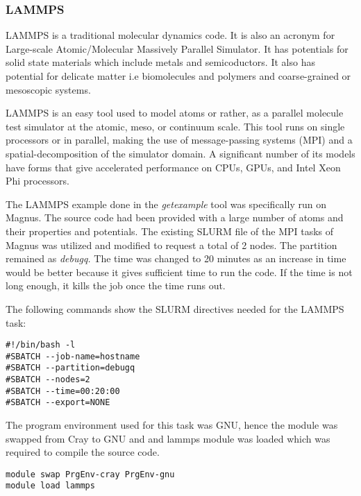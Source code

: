 \subsubsection{LAMMPS}

LAMMPS is a traditional molecular dynamics code. It is also an acronym for Large-scale Atomic/Molecular Massively Parallel Simulator. It has potentials
for solid state materials which include metals and semicoductors. It also has potential for delicate matter i.e biomolecules and polymers and
coarse-grained or mesoscopic systems.

LAMMPS is an easy tool used to model atoms or rather, as a parallel molecule test simulator at the atomic, meso, or continuum scale. This tool runs on
single processors or in parallel, making the use of message-passing systems (MPI) and a spatial-decomposition of the simulator domain. A significant
number of its models have forms that give accelerated performance on CPUs, GPUs, and Intel Xeon Phi processors.

The LAMMPS example done in the \emph{getexample} tool was specifically run on Magnus. The source code had been provided with a large number of atoms and their
properties and potentials. The existing SLURM file of the MPI tasks of Magnus was utilized and modified to request a total of 2 nodes. The partition
remained as \emph{debugq.} The time was changed to 20 minutes as an increase in time would be better because it gives sufficient time to run the code. If the 
time is not long enough, it kills the job once the time runs out.

The following commands show the SLURM directives needed for the LAMMPS task:

\begin{tcolorbox}
\begin{Verbatim}[fontsize=\scriptsize]
#!/bin/bash -l
#SBATCH --job-name=hostname
#SBATCH --partition=debugq
#SBATCH --nodes=2
#SBATCH --time=00:20:00
#SBATCH --export=NONE
\end{Verbatim}
\end{tcolorbox}

The program environment used for this task was GNU, hence the module was swapped from Cray to GNU and and lammps module was loaded which was required
to compile the source code. 

\begin{tcolorbox}
\begin{Verbatim}[fontsize=\scriptsize]
module swap PrgEnv-cray PrgEnv-gnu
module load lammps
\end{Verbatim}
\end{tcolorbox}

